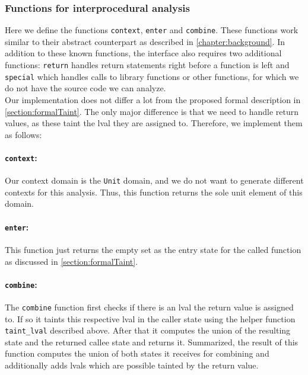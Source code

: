     \subsubsection{Functions for interprocedural analysis}
      Here we define the functions \texttt{context}, \texttt{enter} and \texttt{combine}. These functions work similar to their abstract counterpart as described in \autoref{chapter:background}. In addition to these known functions, the interface also requires two additional functions: \texttt{return} handles return statements right before a function is left and \texttt{special} which handles calls to library functions or other functions, for which we do not have the source code we can analyze.\\
      Our implementation does not differ a lot from the proposed formal description in \autoref{section:formalTaint}. The only major difference is that we need to handle return values, as these taint the \ac{lval} they are assigned to. Therefore, we implement them as follows:

        \paragraph{\texttt{context}:} Our context domain is the \texttt{Unit} domain, and we do not want to generate different contexts for this analysis. Thus, this function returns the sole unit element of this domain. 

        \paragraph{\texttt{enter}:} This function just returns the empty set as the entry state for the called function as discussed in \autoref{section:formalTaint}.

        \paragraph{\texttt{combine}:} The \texttt{combine} function first checks if there is an \ac{lval} the return value is assigned to. If so it taints this respective \ac{lval} in the caller state using the helper function \texttt{taint\_lval} described above. After that it computes the union of the resulting state and the returned callee state and returns it. Summarized, the result of this function computes the union of both states it receives for combining and additionally adds \ac{lval}s which are possible tainted by the return value.


